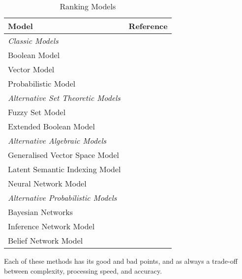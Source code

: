 \begin{table}[htbp]
  \begin{center}
    \begin{tabular}{ll}
      Model & Reference \\
      \hline
      \emph{Classic Models} \\
      \hspace{5mm} Boolean Model & \cite{wmb:mg,BasRib} \\
      \hspace{5mm} Vector Model & \cite{salton71,salton68} \\
      \hspace{5mm} Probabilistic Model & \cite{robertson76,fuhr92} \\
      \emph{Alternative Set Theoretic Models} \\
      \hspace{5mm} Fuzzy Set Model & \cite{radecki79} \\
      \hspace{5mm} Extended Boolean Model & \cite{salton83} \\
      \emph{Alternative Algebraic Models} \\
      \hspace{5mm} Generalised Vector Space Model & \cite{wong85} \\
      \hspace{5mm} Latent Semantic Indexing Model & \cite{furnas88,hull94} \\
      \hspace{5mm} Neural Network Model & \cite{wilkinson91} \\
      \emph{Alternative Probabilistic Models} \\
      \hspace{5mm} Bayesian Networks & \cite{pearl88,fung95} \\
      \hspace{5mm} Inference Network Model & \cite{turtle91,turtle90,LuCallanCroft91:infer_nets} \\
      \hspace{5mm} Belief Network Model & \cite{ribeiro96} \\
    \end{tabular}
    \caption{Ranking Models}
    \label{tab:methods}
  \end{center}
\end{table}

Each of these methods has its good and bad points, and as always a trade-off between complexity, processing speed, and accuracy.


